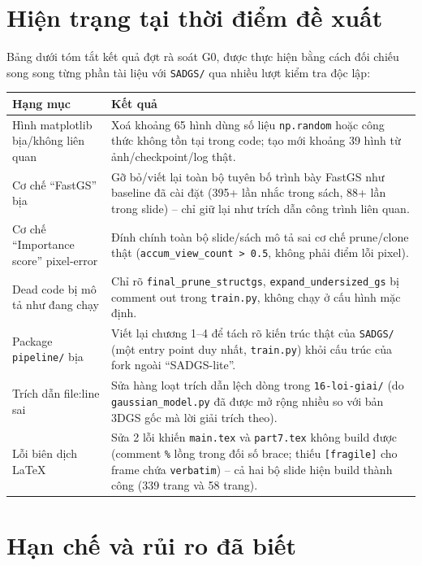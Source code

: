 \documentclass[a4paper,11pt]{article}
\begin{document}
\section{Hiện trạng tại thời điểm đề xuất}

Bảng dưới tóm tắt kết quả đợt rà soát G0, được thực hiện bằng cách đối chiếu song song từng
phần tài liệu với \texttt{SADGS/} qua nhiều lượt kiểm tra độc lập:

\begin{longtable}{@{}p{4.2cm} p{8.9cm}@{}}
\toprule
\textbf{Hạng mục} & \textbf{Kết quả} \\
\midrule
\endhead
Hình matplotlib bịa/không liên quan & Xoá khoảng 65 hình dùng số liệu \texttt{np.random}
hoặc công thức không tồn tại trong code; tạo mới khoảng 39 hình từ ảnh/checkpoint/log thật. \\
Cơ chế ``FastGS'' bịa & Gỡ bỏ/viết lại toàn bộ tuyên bố trình bày FastGS như baseline đã cài
đặt (395+ lần nhắc trong sách, 88+ lần trong slide) -- chỉ giữ lại như trích dẫn công trình
liên quan. \\
Cơ chế ``Importance score'' pixel-error & Đính chính toàn bộ slide/sách mô tả sai cơ chế
prune/clone thật (\texttt{accum\_view\_count > 0.5}, không phải điểm lỗi pixel). \\
Dead code bị mô tả như đang chạy & Chỉ rõ \texttt{final\_prune\_structgs},
\texttt{expand\_undersized\_gs} bị comment out trong \texttt{train.py}, không chạy ở cấu hình
mặc định. \\
Package \texttt{pipeline/} bịa & Viết lại chương 1--4 để tách rõ kiến trúc thật của
\texttt{SADGS/} (một entry point duy nhất, \texttt{train.py}) khỏi cấu trúc của fork ngoài
``SADGS-lite''. \\
Trích dẫn file:line sai & Sửa hàng loạt trích dẫn lệch dòng trong \texttt{16-loi-giai/} (do
\texttt{gaussian\_model.py} đã được mở rộng nhiều so với bản 3DGS gốc mà lời giải trích theo). \\
Lỗi biên dịch LaTeX & Sửa 2 lỗi khiến \texttt{main.tex} và \texttt{part7.tex} không build được
(comment \texttt{\%} lồng trong đối số brace; thiếu \texttt{[fragile]} cho frame chứa
\texttt{verbatim}) -- cả hai bộ slide hiện build thành công (339 trang và 58 trang). \\
\bottomrule
\end{longtable}

\section{Hạn chế và rủi ro đã biết}
\end{document}
